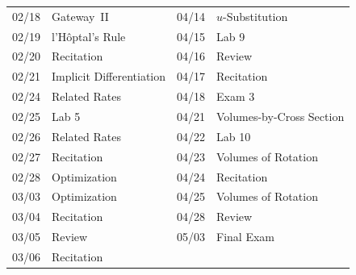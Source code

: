 \documentclass[11pt,letterpaper]{article}
\begin{document}
\begin{table}[!ht]
{\begin{tabular}{ll || ll}
	02/18 & Gateway~II & 04/14 & $u$-Substitution \\
	02/19 & l'H\^{o}ptal's Rule &  04/15 & Lab 9 \\
	02/20 & Recitation & 04/16 & Review \\
	02/21 & Implicit Differentiation & 04/17 & Recitation \\
	02/24 & Related Rates & 04/18 & Exam 3 \\
	02/25 & Lab 5 & 04/21 & Volumes-by-Cross Section \\
	02/26 & Related Rates & 04/22 & Lab 10 \\
	02/27 & Recitation & 04/23 & Volumes of Rotation \\
	02/28 & Optimization & 04/24 & Recitation \\
	03/03 & Optimization & 04/25 & Volumes of Rotation \\
	03/04 & Recitation & 04/28 & Review \\
	03/05 & Review & 05/03 & Final Exam \\
	03/06 & Recitation & 
        \end{tabular}
        }
        \end{table}
\end{document}
